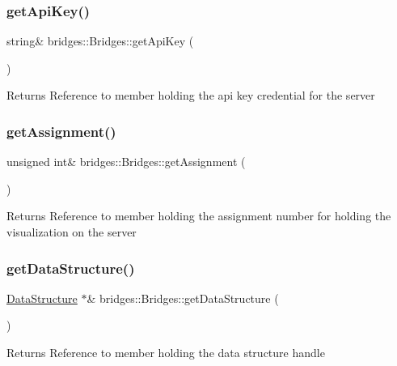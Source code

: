 \subsubsection{\texorpdfstring{get\+Api\+Key()}{getApiKey()}}
{\footnotesize\ttfamily string\& bridges\+::\+Bridges\+::get\+Api\+Key (\begin{DoxyParamCaption}{ }\end{DoxyParamCaption})}

\begin{DoxyReturn}{Returns}
Reference to member holding the api key credential for the server 
\end{DoxyReturn}
\mbox{\label{namespacebridges_1_1_bridges_a535d05a7e5d2bc4775086c53b78a3f06}} 
\subsubsection{\texorpdfstring{get\+Assignment()}{getAssignment()}}
{\footnotesize\ttfamily unsigned int\& bridges\+::\+Bridges\+::get\+Assignment (\begin{DoxyParamCaption}{ }\end{DoxyParamCaption})}

\begin{DoxyReturn}{Returns}
Reference to member holding the assignment number for holding the visualization on the server 
\end{DoxyReturn}
\mbox{\label{namespacebridges_1_1_bridges_a7cee9c57a0cd6a213722ba0a81a742f0}} 
\subsubsection{\texorpdfstring{get\+Data\+Structure()}{getDataStructure()}}
{\footnotesize\ttfamily \mbox{\hyperlink{classbridges_1_1_data_structure}{Data\+Structure}} $\ast$\& bridges\+::\+Bridges\+::get\+Data\+Structure (\begin{DoxyParamCaption}{ }\end{DoxyParamCaption})}

\begin{DoxyReturn}{Returns}
Reference to member holding the data structure handle 
\end{DoxyReturn}
\mbox{\label{namespacebridges_1_1_bridges_a11570abeb2d710440c709bafca816a64}} 
